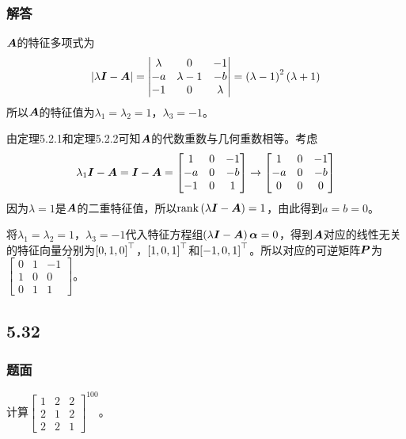 \documentclass{beamer}
\begin{document}
\begin{frame}[allowframebreaks]
    \frametitle{解答}
    \(\boldsymbol{A}\)的特征多项式为
    \begin{equation*}
        \left|\lambda\boldsymbol{I}-\boldsymbol{A} \right|=\begin{vmatrix}\lambda&0&-1\\-a&\lambda-1&-b\\-1&0&\lambda\end{vmatrix}=\left( \lambda-1 \right)^2\left( \lambda+1 \right)
    \end{equation*}
    所以\(\boldsymbol{A}\)的特征值为\(\lambda_1=\lambda_2=1\)，\(\lambda_3=-1\)。

    由定理5.2.1和定理5.2.2可知\(\boldsymbol{A}\)的代数重数与几何重数相等。考虑
    \begin{equation*}
        \lambda_1\boldsymbol{I}-\boldsymbol{A}=\boldsymbol{I}-\boldsymbol{A}=
        \begin{bmatrix}
            1  & 0 & -1 \\
            -a & 0 & -b \\
            -1 & 0 & 1
        \end{bmatrix}\to
        \begin{bmatrix}
            1  & 0 & -1 \\
            -a & 0 & -b \\
            0  & 0 & 0
        \end{bmatrix}
    \end{equation*}
    因为\(\lambda=1\)是\(\boldsymbol{A}\)的二重特征值，所以\(\mathrm{rank}\left( \lambda\boldsymbol{I}-\boldsymbol{A} \right)=1\)，由此得到\(a=b=0\)。

    将\(\lambda_1=\lambda_2=1\)，\(\lambda_3=-1\)代入特征方程组\(\left( \lambda\boldsymbol{I}-\boldsymbol{A} \right)\boldsymbol{\alpha}=0\)，得到\(\boldsymbol{A}\)对应的线性无关的特征向量分别为\(\left[ 0,1,0 \right]^\top\)，\(\left[ 1,0,1 \right]^\top\)和\(\left[ -1,0,1 \right]^\top\)。所以对应的可逆矩阵\(\boldsymbol{P}\)为\(\begin{bmatrix}0&1&-1\\1&0&0\\0&1&1\end{bmatrix}\)。
\end{frame}

\subsection*{5.32}
\begin{frame}
    \frametitle{题面}
    计算\({\begin{bmatrix}1&2&2\\2&1&2\\2&2&1\end{bmatrix}}^{100}\)。
\end{frame}
\end{document}
